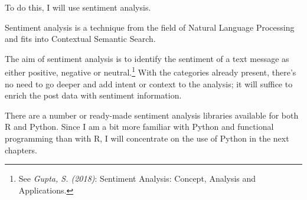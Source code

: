 To do this, I will use sentiment analysis. 

Sentiment analysis is a technique from the field of Natural Language Processing and fits into Contextual Semantic Search. 

The aim of sentiment analysis is to identify the sentiment of a text message as either positive, negative or neutral.\footnote{See \textit{Gupta, S. (2018)}: Sentiment Analysis: Concept, Analysis and Applications.\cite{sentimentAnalysis}} With the categories already present, there's no need to go deeper and add intent or context to the analysis; it will suffice to enrich the post data with sentiment information.

There are a number or ready-made sentiment analysis libraries available for both R and Python. Since I am a bit more familiar with Python and functional programming than with R, I will concentrate on the use of Python in the next chapters.
